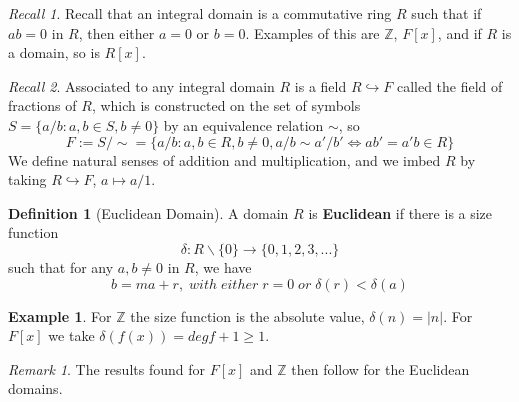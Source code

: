 \documentclass[12pt]{article}
\theoremstyle{definition}
\newtheorem{defn}[thm]{Definition}
\newtheorem{eg}[thm]{Example}
\theoremstyle{remark}
\newtheorem{rmk}[thm]{Remark}
\newtheorem*{rec}{Recall}
\numberwithin{equation}{section}
\newcommand\Z{\mathbb Z}    %
\newcommand\B[1]{\textbf{ #1}}
\begin{document}
\begin{rec}
        Recall that an integral domain is a commutative ring $R$ such that if $ab = 0$ in $R$, then either $a =0$ or $b = 0$. Examples of this are $\Z$, $F[x]$, and if $R$ is a domain, so is $R[x]$.
\end{rec}

\vspace{15pt}

\begin{rec}
        Associated to any integral domain $R$ is a field $R\hookrightarrow F$ called the field of fractions of $R$, which is constructed on the set of symbols $S = \{a/b:a,b\in S, b \neq0\}$ by an equivalence relation $\sim$, so \begin{equation}
                F := S/\sim = \{a/b:a,b \in R, b \neq 0, a/b \sim a'/b' \iff ab' = a'b \in R\}
        \end{equation}
        We define natural senses of addition and multiplication, and we imbed $R$ by taking $R\hookrightarrow F$, $a\mapsto a/1$.
\end{rec}

\vspace{15pt}


\begin{defn}[Euclidean Domain]
        A domain $R$ is \B{Euclidean} if there is a size function \begin{equation}
                \delta:R\backslash \{0\}\rightarrow \{0,1,2,3,...\}
        \end{equation}
        such that for any $a,b \neq 0$ in $R$, we have \begin{equation}
                b = ma + r,\;with\;either\;r=0\;or\;\delta(r) < \delta(a)
        \end{equation}
\end{defn}

\vspace{15pt}

\begin{eg}
        For $\Z$ the size function is the absolute value, $\delta(n) = |n|$. For $F[x]$ we take $\delta(f(x)) = deg f + 1 \geq 1$.
\end{eg}

\vspace{15pt}

\begin{rmk}
        The results found for $F[x]$ and $\Z$ then follow for the Euclidean domains.
\end{rmk}
\end{document}
